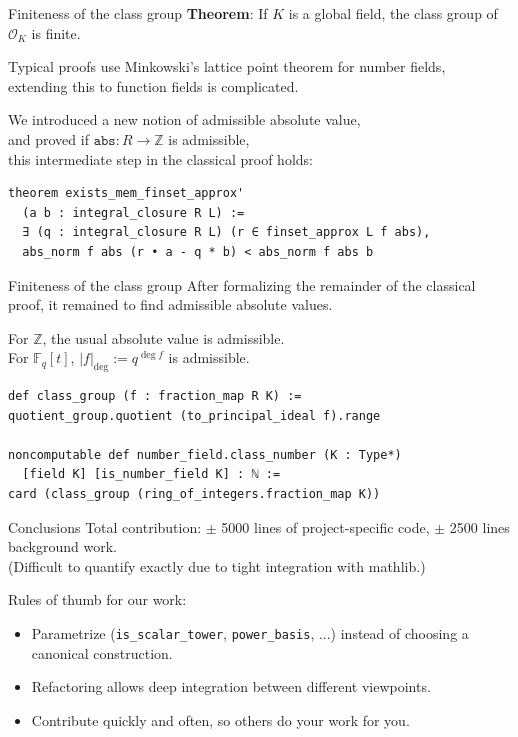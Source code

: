 \documentclass{beamer}
\newcommand{\lean}[1]{\texttt{#1}\xspace}
\newcommand*{\OK}[1][K]{\mathcal{O}_{#1}}
\newcommand*{\Fq}[1][q]{\mathbb{F}_{#1}}
\newcommand{\mathlib}{\textsf{mathlib}\xspace}
\newcommand{\Z}{\mathbb{Z}}
\begin{document}
\begin{frame}[fragile]{Finiteness of the class group}
	\textbf{Theorem}: If $K$ is a global field, the class group of $\OK$ is finite.

	Typical proofs use Minkowski's lattice point theorem for number fields,\\
	extending this to function fields is complicated.

\pause
	We introduced a new notion of \alert{admissible absolute value},\\
	and proved if $\lean{abs} : R \to \Z$ is admissible,\\
	this intermediate step in the classical proof holds:
\begin{lstlisting}
theorem exists_mem_finset_approx'
  (a b : integral_closure R L) :=
  ∃ (q : integral_closure R L) (r ∈ finset_approx L f abs),
  abs_norm f abs (r • a - q * b) < abs_norm f abs b
\end{lstlisting}
\end{frame}

\begin{frame}[fragile]{Finiteness of the class group}
	After formalizing the remainder of the classical proof,
	it remained to find admissible absolute values.

	For $\Z$, the usual absolute value is admissible.\\
	For $\Fq[q][t]$, $\lvert f\rvert_{\deg}:=q^{\deg f}$ is admissible.

\vspace{\baselineskip}
\pause
\begin{lstlisting}
def class_group (f : fraction_map R K) :=
quotient_group.quotient (to_principal_ideal f).range

noncomputable def number_field.class_number (K : Type*)
  [field K] [is_number_field K] : ℕ :=
card (class_group (ring_of_integers.fraction_map K))
\end{lstlisting}
\end{frame}

\begin{frame}{Conclusions}
	Total contribution: $\pm$ 5000 lines of project-specific code, $\pm$ 2500 lines background work.\\
	(Difficult to quantify exactly due to tight integration with \mathlib.)

\pause
	Rules of thumb for our work:
	\begin{itemize}
		\item Parametrize (\lean{is\_scalar\_tower}, \lean{power\_basis}, ...) instead of choosing a canonical construction.
		\item Refactoring allows deep integration between different viewpoints.
		\item Contribute quickly and often, so others do your work for you.
	\end{itemize}

\end{frame}
\end{document}
